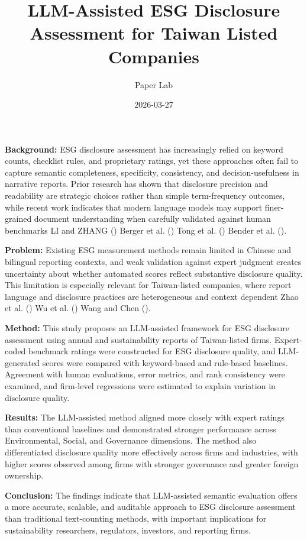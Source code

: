 \documentclass[
  12pt,
]{article}
\title{LLM-Assisted ESG Disclosure Assessment for Taiwan Listed
Companies}
\author{Paper Lab}
\date{2026-03-27}
\begin{document}
\maketitle


\textbf{Background:} ESG disclosure assessment has increasingly relied
on keyword counts, checklist rules, and proprietary ratings, yet these
approaches often fail to capture semantic completeness, specificity,
consistency, and decision-usefulness in narrative reports. Prior
research has shown that disclosure precision and readability are
strategic choices rather than simple term-frequency outcomes, while
recent work indicates that modern language models may support
finer-grained document understanding when carefully validated against
human benchmarks LI and ZHANG () Berger et
al. () Tong et al.
() Bender et al.
().

\textbf{Problem:} Existing ESG measurement methods remain limited in
Chinese and bilingual reporting contexts, and weak validation against
expert judgment creates uncertainty about whether automated scores
reflect substantive disclosure quality. This limitation is especially
relevant for Taiwan-listed companies, where report language and
disclosure practices are heterogeneous and context dependent Zhao et al.
() Wu et al. ()
Wang and Chen ().

\textbf{Method:} This study proposes an LLM-assisted framework for ESG
disclosure assessment using annual and sustainability reports of
Taiwan-listed firms. Expert-coded benchmark ratings were constructed for
ESG disclosure quality, and LLM-generated scores were compared with
keyword-based and rule-based baselines. Agreement with human
evaluations, error metrics, and rank consistency were examined, and
firm-level regressions were estimated to explain variation in disclosure
quality.

\textbf{Results:} The LLM-assisted method aligned more closely with
expert ratings than conventional baselines and demonstrated stronger
performance across Environmental, Social, and Governance dimensions. The
method also differentiated disclosure quality more effectively across
firms and industries, with higher scores observed among firms with
stronger governance and greater foreign ownership.

\textbf{Conclusion:} The findings indicate that LLM-assisted semantic
evaluation offers a more accurate, scalable, and auditable approach to
ESG disclosure assessment than traditional text-counting methods, with
important implications for sustainability researchers, regulators,
investors, and reporting firms.
\end{document}
